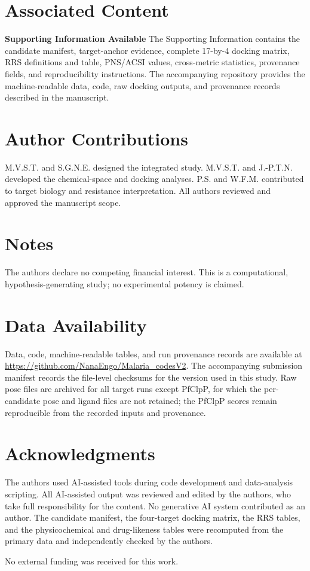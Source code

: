 \documentclass[journal=jcisd8,manuscript=article]{achemso}
\begin{document}
\section*{Associated Content}
\textbf{Supporting Information Available}
The Supporting Information contains the candidate manifest, target-anchor evidence, complete 17-by-4 docking matrix, RRS definitions and table, PNS/ACSI values, cross-metric statistics, provenance fields, and reproducibility instructions. The accompanying repository provides the machine-readable data, code, raw docking outputs, and provenance records described in the manuscript.

\section*{Author Contributions}
M.V.S.T. and S.G.N.E. designed the integrated study. M.V.S.T. and J.-P.T.N. developed the chemical-space and docking analyses. P.S. and W.F.M. contributed to target biology and resistance interpretation. All authors reviewed and approved the manuscript scope.

\section*{Notes}
The authors declare no competing financial interest. This is a computational, hypothesis-generating study; no experimental potency is claimed.

\section*{Data Availability}
Data, code, machine-readable tables, and run provenance records are available at \url{https://github.com/NanaEngo/Malaria_codesV2}. The accompanying submission manifest records the file-level checksums for the version used in this study. Raw pose files are archived for all target runs except PfClpP, for which the per-candidate pose and ligand files are not retained; the PfClpP scores remain reproducible from the recorded inputs and provenance.

\section*{Acknowledgments}
The authors used AI-assisted tools during code development and data-analysis scripting. All AI-assisted output was reviewed and edited by the authors, who take full responsibility for the content. No generative AI system contributed as an author. The candidate manifest, the four-target docking matrix, the RRS tables, and the physicochemical and drug-likeness tables were recomputed from the primary data and independently checked by the authors.

No external funding was received for this work.


\end{document}
